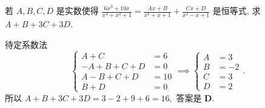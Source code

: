 \begin{prob}
\label{prob:prob-7}
若 $A,B,C,D$ 是实数使得 $\frac{6x^3 + 10x}{x^4 + x^2 + 1} =
\frac{Ax + B}{x^2 + x + 1} + \frac{Cx + D}{x^2 - x + 1}$ 是恒等式,
求 $A + B + 3C + 3D$.
\end{prob}

\begin{soln}
待定系数法
\[
\begin{cases}
A + C         &=6\\
-A + B + C + D&=0\\
A - B + C + D &=10\\
B + D         &=0
\end{cases}
\implies
\begin{cases}
A &=3\\
B &=-2\\
C &=3\\
D &=2
\end{cases}.
\]
所以 $A+B+3C+3D = 3-2+9+6 = 16,$ 答案是 $\boxed{\textbf{D}.}$
\end{soln}
